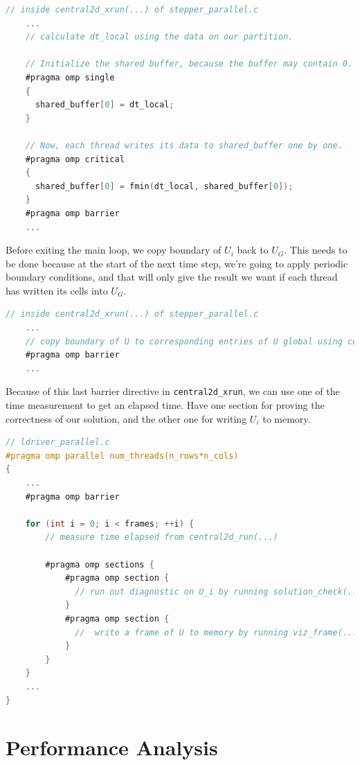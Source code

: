 \documentclass{article}
\begin{document}
\begin{lstlisting}[language=C]
// inside central2d_xrun(...) of stepper_parallel.c
    ...
    // calculate dt_local using the data on our partition.

    // Initialize the shared buffer, because the buffer may contain 0.
    #pragma omp single
    {
      shared_buffer[0] = dt_local;
    }

    // Now, each thread writes its data to shared_buffer one by one.
    #pragma omp critical
    {
      shared_buffer[0] = fmin(dt_local, shared_buffer[0]);
    }
    #pragma omp barrier
    ...
\end{lstlisting}

Before exiting the main loop, we copy boundary of $U_i$ back to $U_G$. This needs to be done because at the start of the next time step, we're going to apply periodic boundary conditions, and that will only give the result we want if each thread has written its cells into $U_G$.

\begin{lstlisting}[language=C]
// inside central2d_xrun(...) of stepper_parallel.c
    ...
    // copy boundary of U to corresponding entries of U global using central2d_local_to_global(...)
    #pragma omp barrier
    ...
\end{lstlisting}

Because of this last barrier directive in \texttt{central2d\_xrun}, we can use one of the time measurement to get an elapsed time. Have one section for proving the correctness of our solution, and the other one for writing $U_i$ to memory.

\begin{lstlisting}[language=C]
// ldriver_parallel.c
#pragma omp parallel num_threads(n_rows*n_cols)
{
    ...
    #pragma omp barrier

    for (int i = 0; i < frames; ++i) {
        // measure time elapsed from central2d_run(...)

        #pragma omp sections {
            #pragma omp section {
              // run out diagnostic on U_i by running solution_check(...)
            }
            #pragma omp section {
              //  write a frame of U to memory by running viz_frame(...);
            }
        }
    }
    ...
}
\end{lstlisting}

\section{Performance Analysis}
\end{document}
